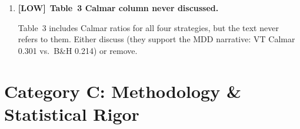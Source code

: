 \documentclass[12pt,a4paper]{article}
\newcommand{\LOW}{\textcolor{lowsev}{\textbf{[LOW]}}}
\begin{document}
\begin{enumerate}[label=\textbf{B.\arabic*}]
The paper's research system has produced three experiments that directly support the paper's thesis:
\begin{itemize}
    \item \textbf{K687}: No VT beats BH 50/50 on Sharpe after lag correction $\Rightarrow$ supports ``VT = insurance not alpha''
    \item \textbf{K697}: VIX predicts vol magnitude ($r = 0.57$) but not direction ($r = 0.04$) $\Rightarrow$ directly validates VIX-level mechanism
    \item \textbf{K688}: CRRA utility $\gamma \geq 5$ favors VT $\Rightarrow$ formal answer to Cederburg (2020) critique
\end{itemize}

The paper currently handles the Cederburg rebuttal with hand-waving (``utility tests may underweight the MDD channel''). K688 provides the specific breakeven parameter ($\gamma \approx 5$), which is much stronger. K697 provides direct empirical evidence for the VIX-level mechanism that the paper claims but does not formally test.

The v2 review (A.1) rated this HIGH. It remains the paper's ``main weakness'' per the review's own assessment.

\textbf{Recommendation:} Add (a) a footnote citing K687 as confirming VT Sharpe improvement vanishes against optimal baseline, reinforcing insurance interpretation; (b) a paragraph in Section~4.2 citing K697 magnitude-vs-direction evidence; (c) K688's $\gamma \geq 5$ breakeven in the Cederburg rebuttal paragraph.


\item \LOW\ \textbf{Table~3 Calmar column never discussed.}

Table~3 includes Calmar ratios for all four strategies, but the text never refers to them. Either discuss (they support the MDD narrative: VT Calmar 0.301 vs.\ B\&H 0.214) or remove.

\end{enumerate}


\section{Category C: Methodology \& Statistical Rigor}
\label{sec:methodology}
\end{document}

